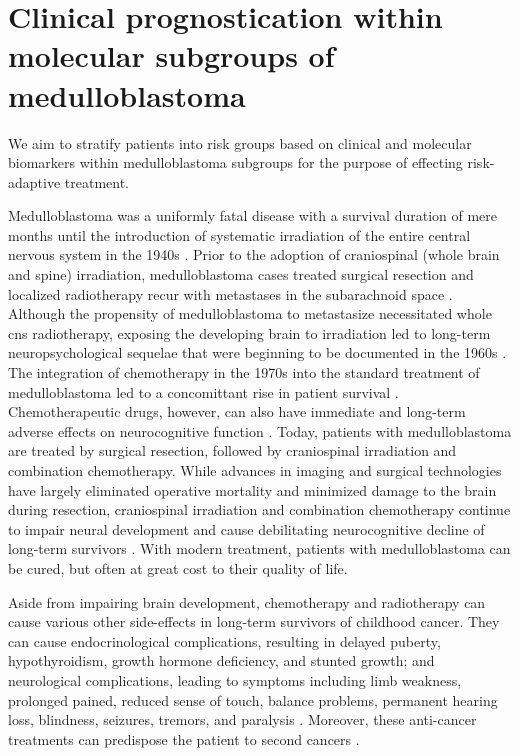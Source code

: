 \chapter{Clinical prognostication within molecular subgroups of medulloblastoma}
\label{ch:clin-prog}

\begin{objective}
We aim to stratify patients into risk groups based on clinical and molecular biomarkers within medulloblastoma subgroups for the purpose of effecting risk-adaptive treatment.
\end{objective}

Medulloblastoma was a uniformly fatal disease with a survival duration of mere months until the introduction of systematic irradiation of the entire central nervous system in the 1940s . Prior to the adoption of craniospinal (whole brain and spine) irradiation, medulloblastoma cases treated surgical resection and localized radiotherapy recur with metastases in the subarachnoid space . Although the propensity of medulloblastoma to metastasize necessitated whole \gls{cns} radiotherapy, exposing the developing brain to irradiation led to long-term neuropsychological sequelae that were beginning to be documented in the 1960s . The integration of chemotherapy in the 1970s into the standard treatment of medulloblastoma led to a concomittant rise in patient survival . Chemotherapeutic drugs, however, can also have immediate and long-term adverse effects on neurocognitive function . Today, patients with medulloblastoma are treated by surgical resection, followed by craniospinal irradiation and combination chemotherapy. While advances in imaging and surgical technologies have largely eliminated operative mortality and minimized damage to the brain during resection, craniospinal irradiation and combination chemotherapy continue to impair neural development and cause debilitating neurocognitive decline of long-term survivors . With modern treatment, patients with medulloblastoma can be cured, but often at great cost to their quality of life.

Aside from impairing brain development, chemotherapy and radiotherapy can cause various other side-effects in long-term survivors of childhood cancer. They can cause endocrinological complications, resulting in delayed puberty, hypothyroidism, growth hormone deficiency, and stunted growth; and neurological complications, leading to symptoms including limb weakness, prolonged pained, reduced sense of touch, balance problems, permanent hearing loss, blindness, seizures, tremors, and paralysis . Moreover, these anti-cancer treatments can predispose the patient to second cancers .

